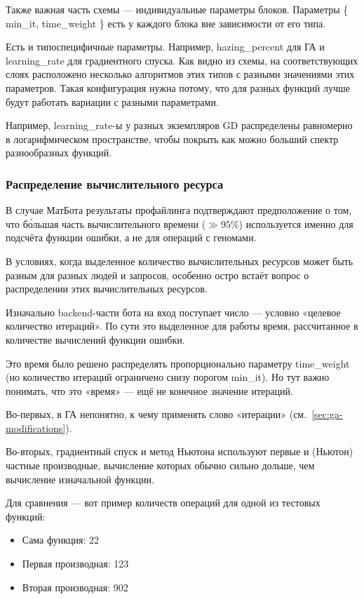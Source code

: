\documentclass[11pt]{article}
\begin{document}
    Также важная часть схемы — индивидуальные параметры блоков.
    Параметры \{ min\_it, time\_weight \} есть у каждого блока вне зависимости от его типа.

    Есть и типоспецифичные параметры.
    Например, hazing\_percent для ГА и learning\_rate для градиентного спуска.
    Как видно из схемы, на соответствующих слоях расположено несколько алгоритмов этих типов с разными значениями этих параметров.
    Такая конфигурация нужна потому, что для разных функций лучше будут работать вариации с разными параметрами.

    Например, learning\_rate-ы у разных экземпляров GD распределены равномерно в логарифмическом пространстве, чтобы покрыть
    как можно больший спектр разнообразных функций.

    \subsubsection{Распределение вычислительного ресурса}\label{subsubsec:resource-distribution}

    В случае МатБота результаты профайлинга подтверждают предположение о том, что бо́льшая часть вычислительного времени ($\gg 95\%$)
    используется именно для подсчёта функции ошибки, а не для операций с геномами.

    В условиях, когда выделенное количество вычислительных ресурсов может быть разным для разных людей и запросов,
    особенно остро встаёт вопрос о распределении этих вычислительных ресурсов.

    Изначально backend-части бота на вход поступает число — условно «целевое количество итераций».
    По сути это выделенное для работы время, рассчитанное в количестве вычислений функции ошибки.

    Это время было решено распределять пропорционально параметру time\_weight (но количество итераций ограничено снизу порогом min\_it).
    Но тут важно понимать, что это «время» — ещё не конечное значение итераций.

    Во-первых, в ГА непонятно, к чему применять слово «итерации» (см.~\ref{sec:ga-modifications}).

    Во-вторых, градиентный спуск и метод Ньютона используют первые и (Ньютон) частные производные,
    вычисление которых обычно сильно дольше, чем вычисление изначальной функции.

    Для сравнения — вот пример количеств операций для одной из тестовых функций:
    \begin{itemize}
        \item Сама функция: 22
        \item Первая производная: 123
        \item Вторая производная: 902
    \end{itemize}
\end{document}
